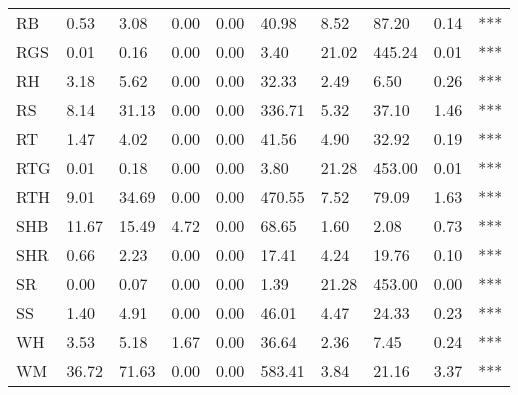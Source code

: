 \begin{landscape}
\begin{table}[]
\begin{tabular}{lllllllllc}
RB   & 0.53   & 3.08   & 0.00   & 0.00 & 40.98   & 8.52     & 87.20    & 0.14  & ***               \\
RGS  & 0.01   & 0.16   & 0.00   & 0.00 & 3.40    & 21.02    & 445.24   & 0.01  & ***               \\
RH   & 3.18   & 5.62   & 0.00   & 0.00 & 32.33   & 2.49     & 6.50     & 0.26  & ***               \\
RS   & 8.14   & 31.13  & 0.00   & 0.00 & 336.71  & 5.32     & 37.10    & 1.46  & ***               \\
RT   & 1.47   & 4.02   & 0.00   & 0.00 & 41.56   & 4.90     & 32.92    & 0.19  & ***               \\
RTG  & 0.01   & 0.18   & 0.00   & 0.00 & 3.80    & 21.28    & 453.00   & 0.01  & ***               \\
RTH  & 9.01   & 34.69  & 0.00   & 0.00 & 470.55  & 7.52     & 79.09    & 1.63  & ***               \\
SHB  & 11.67  & 15.49  & 4.72   & 0.00 & 68.65   & 1.60     & 2.08     & 0.73  & ***               \\
SHR  & 0.66   & 2.23   & 0.00   & 0.00 & 17.41   & 4.24     & 19.76    & 0.10  & ***               \\
SR   & 0.00   & 0.07   & 0.00   & 0.00 & 1.39    & 21.28    & 453.00   & 0.00  & ***               \\
SS   & 1.40   & 4.91   & 0.00   & 0.00 & 46.01   & 4.47     & 24.33    & 0.23  & ***               \\
WH   & 3.53   & 5.18   & 1.67   & 0.00 & 36.64   & 2.36     & 7.45     & 0.24  & ***               \\
WM   & 36.72  & 71.63  & 0.00   & 0.00 & 583.41  & 3.84     & 21.16    & 3.37  & ***               \\ 
\hline
\end{tabular}
\end{table}
\end{landscape}